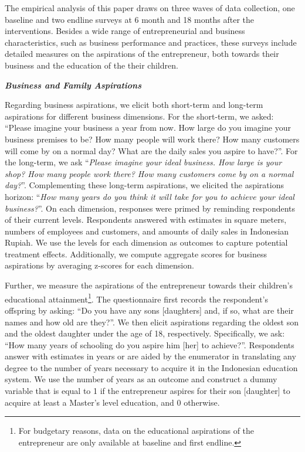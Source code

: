 \documentclass[11.5pt]{article}
\begin{document}
The empirical analysis of this paper draws on three waves of data collection, one baseline and two endline surveys at 6 month and 18 months after the interventions. Besides a wide range of entrepreneurial and business characteristics, such as business performance and practices, these surveys include detailed measures on the aspirations of the entrepreneur, both towards their business and the education of the their children.

\textbf{\emph{Business and Family Aspirations}}

Regarding business aspirations, we elicit both short-term and long-term aspirations for different business dimensions. For the short-term, we asked: ``Please imagine your business a year from now. How large do you imagine your business premises to be? How many people will work there? How many customers will come by on a normal day? What are the daily sales you aspire to have?''. For the long-term, we ask ``\emph{Please imagine your ideal business. How large is your shop? How many people work there? How many customers come by on a normal day?}''. Complementing these long-term aspirations, we elicited the aspirations horizon: ``\emph{How many years do you think it will take for you to achieve your ideal business?}''. On each dimension, responses were primed by reminding respondents of their current levels. Respondents answered with estimates in square meters, numbers of employees and customers, and amounts of daily sales in Indonesian Rupiah. We use the levels for each dimension as outcomes to capture potential treatment effects. Additionally, we compute aggregate scores for business aspirations by averaging z-scores for each dimension.

Further, we measure the aspirations of the entrepreneur towards their children's educational attainment\footnote{For budgetary reasons, data on the educational aspirations of the entrepreneur are only available at baseline and first endline.}. The questionnaire first records the respondent's offspring by asking: ``Do you have any sons [daughters] and, if so, what are their names and how old are they?''. We then elicit aspirations regarding the oldest son and the oldest daughter under the age of 18, respectively. Specifically, we ask: ``How many years of schooling do you aspire him [her] to achieve?''. Respondents answer with estimates in years or are aided by the enumerator in translating any degree to the number of years necessary to acquire it in the Indonesian education system. We use the number of years as an outcome and construct a dummy variable that is equal to 1 if the entrepreneur aspires for their son [daughter] to acquire at least a Master's level education, and 0 otherwise. \\
\end{document}
